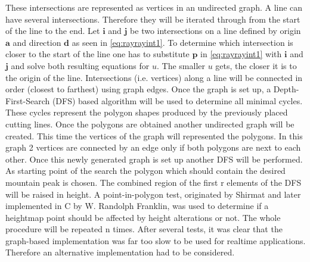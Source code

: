 \documentclass[11pt,a4paper,twoside,openright]{report}
\begin{document}
These intersections are represented as vertices in an undirected graph. A line can have several intersections. Therefore they will be iterated through from the start of the line to the end. Let $\mathbf{i}$ and $\mathbf{j}$ be two intersections on a line defined by origin $\mathbf{a}$ and direction $\mathbf{d}$ as seen in \cref{eq:rayrayint1}. To determine which intersection is closer to the start of the line one has to substitute $\mathbf{p}$ in \cref{eq:rayrayint1} with $\mathbf{i}$ and $\mathbf{j}$ and solve both resulting equations for $u$. The smaller $u$ gets, the closer it is to the origin of the line. Intersections (i.e. vertices) along a line will be connected in order (closest to farthest) using graph edges. Once the graph is set up, a Depth-First-Search (DFS) based algorithm will be used to determine all minimal cycles. These cycles represent the polygon shapes produced by the previously placed cutting lines. Once the polygons are obtained another undirected graph will be created. This time the vertices of the graph will represented the polygons. In this graph 2 vertices are connected by an edge only if both polygons are next to each other. Once this newly generated graph is set up another DFS will be performed. As starting point of the search the polygon which should contain the desired mountain peak is chosen. The combined region of the first r elements of the DFS will be raised in height. A point-in-polygon test, originated by Shirmat \cite{Shimrat:1962:APP:368637.368653} and later implemented in C by W. Randolph Franklin, was used to determine if a heightmap point should be affected by height alterations or not. The whole procedure will be repeated n times. After several tests, it was clear that the graph-based implementation was far too slow to be used for realtime applications. Therefore an alternative implementation had to be considered.
\end{document}
